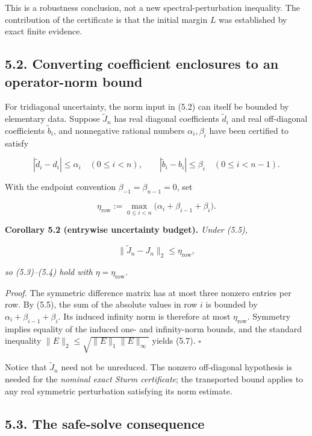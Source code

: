 \documentclass[
  11pt,
]{article}
\begin{document}
This is a robustness conclusion, not a new spectral-perturbation
inequality. The contribution of the certificate is that the initial
margin \(L\) was established by exact finite evidence.

\subsection{5.2. Converting coefficient enclosures to an operator-norm
bound}\label{converting-coefficient-enclosures-to-an-operator-norm-bound}

For tridiagonal uncertainty, the norm input in (5.2) can itself be
bounded by elementary data. Suppose \(\widetilde J_n\) has real diagonal
coefficients \(\widetilde d_i\) and real off-diagonal coefficients
\(\widetilde b_i\), and nonnegative rational numbers
\(\alpha_i,\beta_i\) have been certified to satisfy

\[
|\widetilde d_i-d_i|\le\alpha_i
\quad(0\le i<n),
\qquad
|\widetilde b_i-b_i|\le\beta_i
\quad(0\le i<n-1).
\tag{5.5}
\]

With the endpoint convention \(\beta_{-1}=\beta_{n-1}=0\), set

\[
\eta_{\mathrm{row}}
:=\max_{0\le i<n}\bigl(\alpha_i+\beta_{i-1}+\beta_i\bigr).
\tag{5.6}
\]

\textbf{Corollary 5.2 (entrywise uncertainty budget).} \emph{Under
(5.5),}

\[
\|\widetilde J_n-J_n\|_2\le\eta_{\mathrm{row}},
\tag{5.7}
\]

\emph{so (5.3)--(5.4) hold with \(\eta=\eta_{\mathrm{row}}\).}

\emph{Proof.} The symmetric difference matrix has at most three nonzero
entries per row. By (5.5), the sum of the absolute values in row \(i\)
is bounded by \(\alpha_i+\beta_{i-1}+\beta_i\). Its induced infinity
norm is therefore at most \(\eta_{\mathrm{row}}\). Symmetry implies
equality of the induced one- and infinity-norm bounds, and the standard
inequality \(\|E\|_2\le\sqrt{\|E\|_1\|E\|_\infty}\) yields (5.7).
\(\square\)

Notice that \(\widetilde J_n\) need not be unreduced. The nonzero
off-diagonal hypothesis is needed for the \emph{nominal exact Sturm
certificate}; the transported bound applies to any real symmetric
perturbation satisfying its norm estimate.

\subsection{5.3. The safe-solve
consequence}\label{the-safe-solve-consequence}
\end{document}
